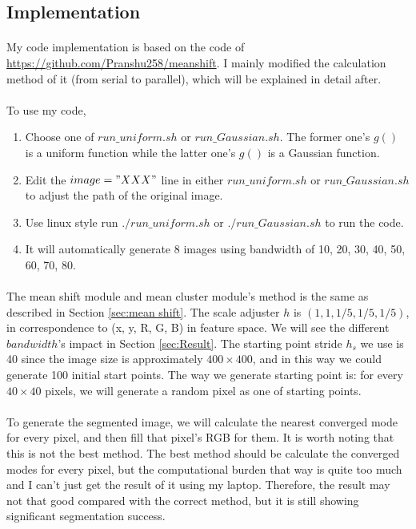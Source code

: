 \documentclass{gapd}
\begin{document}
\subsection{Implementation}
\label{sec:implementation}
\paragraph{}
	My code implementation is based on the code of \href{https://github.com/Pranshu258/meanshift}{https://github.com/Pranshu258/meanshift}. I mainly modified the calculation method of it (from serial to parallel), which will be explained in detail after. 
\paragraph{}
	To use my code, 
	\begin{enumerate}
		\item Choose one of $run\_uniform.sh$ or $run\_Gaussian.sh$. The former one's $g()$ is a uniform function while the latter one's $g()$ is a Gaussian function. 
		\item Edit the $image="XXX"$ line in either $run\_uniform.sh$ or $run\_Gaussian.sh$ to adjust the path of the original image. 
		\item Use linux style run $./run\_uniform.sh$ or $./run\_Gaussian.sh$ to run the code. 
		\item It will automatically generate 8 images using bandwidth of 10, 20, 30, 40, 50, 60, 70, 80. 
	\end{enumerate}
\paragraph{}
	The mean shift module and mean cluster module's method is the same as described in Section \ref{sec:mean shift}. The scale adjuster $h$ is $(1, 1, 1/5, 1/5, 1/5)$, in correspondence to (x, y, R, G, B) in feature space. We will see the different $bandwidth$'s impact in Section \ref{sec:Result}. The starting point stride $h_s$ we use is 40 since the image size is approximately $400 \times 400$, and in this way we could generate 100 initial start points. The way we generate starting point is: for every $40 \times 40$ pixels, we will generate a random pixel as one of starting points. 
\paragraph{}
	To generate the segmented image, we will calculate the nearest converged mode for every pixel, and then fill that pixel's RGB for them. It is worth noting that this is not the best method. The best method should be calculate the converged modes for every pixel, but the computational burden that way is quite too much and I can't just get the result of it using my laptop. Therefore, the result may not that good compared with the correct method, but it is still showing significant segmentation success. 
\end{document}
